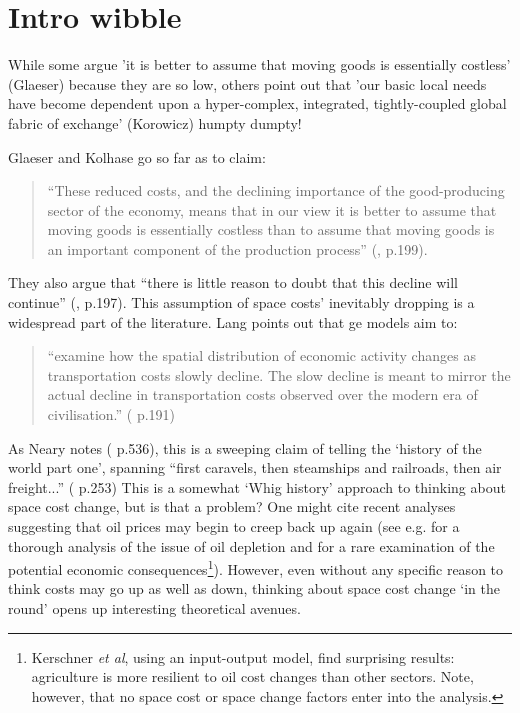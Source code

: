 
\section{Intro wibble}


While some argue 'it is better to assume that moving goods is essentially costless' (Glaeser) because they are so low, others point out that 'our basic local needs have become dependent upon a hyper-complex, integrated, tightly-coupled global fabric of exchange' (Korowicz) 
humpty dumpty!

Glaeser and Kolhase go so far as to claim:
\begin{quote}
``These reduced costs, and the declining importance of the good-producing sector of the economy, means that in our view it is better to assume that moving goods is essentially costless than to assume that moving goods is an important component of the production process'' (\citealt{glaeser_cities_2004}, p.199).
\end{quote}

They also argue that ``there is little reason to doubt that this decline will continue'' (\citealt{glaeser_cities_2004}, p.197). This assumption of space costs' inevitably dropping is a widespread part of the literature. Lang points out that \gls{ge} models aim to:
\begin{quote}
``examine how the spatial distribution of economic activity changes as transportation costs slowly decline. The slow decline is meant to mirror the actual decline in transportation costs observed over the modern era of civilisation.'' (\citealt{lang_heterogeneous_2010} p.191)
\end{quote}

As Neary notes (\citealt{neary_hype_2001} p.536), this is a sweeping claim of telling the `history of the world part one', spanning ``first caravels, then steamships and railroads, then air freight...'' (\citealt{fujita_spatial_2001} p.253) This is a somewhat `Whig history' approach to thinking about space cost change, but is that a problem? One might cite recent analyses suggesting that oil prices may begin to creep back up again (see e.g. \citealt{sorrell_assessment_2009} for a thorough analysis of the issue of oil depletion and \citealt{kerschner_assessing_2009} for a rare examination of the potential economic consequences\footnote{Kerschner \emph{et al}, using an input-output model, find surprising results: agriculture is more resilient to oil cost changes than other sectors. Note, however, that no space cost or space change factors enter into the analysis.}). However, even without any specific reason to think costs may go up as well as down, thinking about space cost change `in the round' opens up interesting theoretical avenues.

